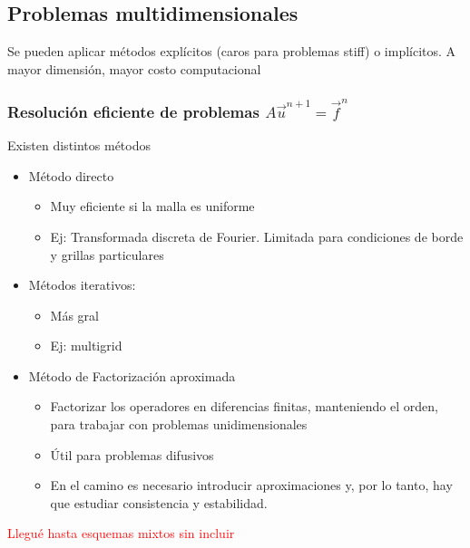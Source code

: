 \documentclass[aps,prb,twocolumn,superscriptaddress,floatfix,longbibliography]{revtex4-2}
\newcounter{para}
\begin{document}
\subsection{Problemas multidimensionales}
Se pueden aplicar métodos explícitos (caros para problemas stiff) o implícitos. A mayor dimensión, mayor costo computacional

\subsubsection{Resolución eficiente de problemas $A \vec{u}^{n+1} = \vec{f}^n$}
Existen distintos métodos

\begin{itemize}
    \item Método directo
    \begin{itemize}
        \item Muy eficiente si la malla es uniforme
        \item Ej: Transformada discreta de Fourier. Limitada para condiciones de borde y grillas particulares
    \end{itemize}
    \item Métodos iterativos: 
    \begin{itemize}
        \item Más gral
        \item Ej: multigrid
    \end{itemize}
    \item Método de Factorización aproximada
    \begin{itemize}
        \item Factorizar los operadores en diferencias finitas, manteniendo el orden, para trabajar con problemas unidimensionales
        \item Útil para problemas difusivos
        \item En el camino es necesario introducir aproximaciones y, por lo tanto, hay que estudiar consistencia y estabilidad.
    \end{itemize}
\end{itemize}


\textcolor{red}{Llegué hasta esquemas mixtos sin incluir}


\end{document}
